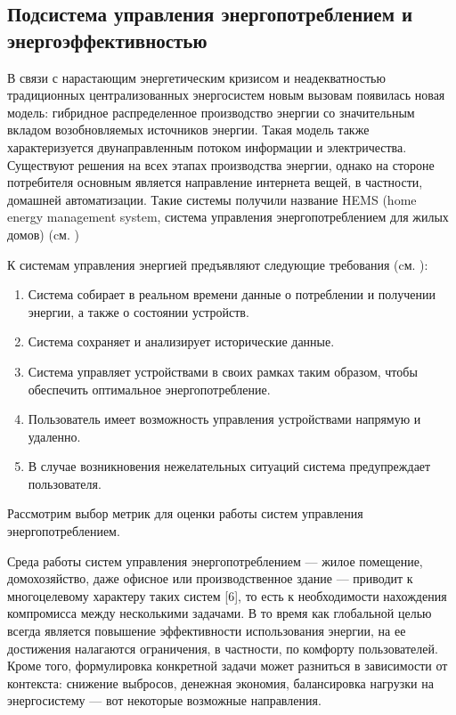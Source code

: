 \subsection{Подсистема управления энергопотреблением и энергоэффективностью}
В связи с нарастающим энергетическим кризисом и неадекватностью традиционных централизованных энергосистем новым вызовам появилась новая модель: гибридное распределенное производство энергии со значительным вкладом возобновляемых источников энергии. Такая модель также характеризуется двунаправленным потоком информации и электричества. Существуют решения на всех этапах производства энергии, однако на стороне потребителя основным является направление интернета вещей, в частности, домашней автоматизации. Такие системы получили название HEMS (home energy management system, система управления энергопотреблением для жилых домов) (cм. )

К системам управления энергией предъявляют следующие требования (cм. ):

\begin{enumerate}
	\item Система собирает в реальном времени данные о потреблении и получении энергии, а также о состоянии устройств.
	\item Система сохраняет и анализирует исторические данные.
	\item Система управляет устройствами в своих рамках таким образом, чтобы обеспечить оптимальное энергопотребление.
	\item Пользователь имеет возможность управления устройствами напрямую и удаленно.
	\item В случае возникновения нежелательных ситуаций система предупреждает пользователя.
\end{enumerate}

Рассмотрим выбор метрик для оценки работы систем управления энергопотреблением.

Среда работы систем управления энергопотреблением --- жилое помещение, домохозяйство, даже офисное или производственное здание --- приводит к многоцелевому характеру таких систем [6], то есть к необходимости нахождения компромисса между несколькими задачами. В то время как глобальной целью всегда является повышение эффективности использования энергии, на ее достижения налагаются ограничения, в частности, по комфорту пользователей. Кроме того, формулировка конкретной задачи может разниться в зависимости от контекста: снижение выбросов, денежная экономия, балансировка нагрузки на энергосистему — вот некоторые возможные направления.

